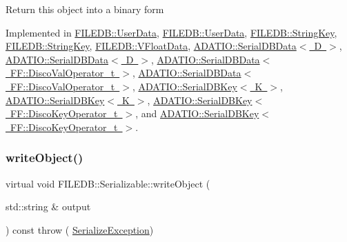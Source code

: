 Return this object into a binary form 

Implemented in \mbox{\hyperlink{classFILEDB_1_1UserData_a42b5e25b3cba7274363590c5b6861795}{F\+I\+L\+E\+D\+B\+::\+User\+Data}}, \mbox{\hyperlink{classFILEDB_1_1UserData_a42b5e25b3cba7274363590c5b6861795}{F\+I\+L\+E\+D\+B\+::\+User\+Data}}, \mbox{\hyperlink{classFILEDB_1_1StringKey_a29db7eea425c851c5e0a4336d7a85fb1}{F\+I\+L\+E\+D\+B\+::\+String\+Key}}, \mbox{\hyperlink{classFILEDB_1_1StringKey_a29db7eea425c851c5e0a4336d7a85fb1}{F\+I\+L\+E\+D\+B\+::\+String\+Key}}, \mbox{\hyperlink{classFILEDB_1_1VFloatData_afad9c7e520cdd7bf9ae0b477b8a5f1f1}{F\+I\+L\+E\+D\+B\+::\+V\+Float\+Data}}, \mbox{\hyperlink{classADATIO_1_1SerialDBData_a5266e4f1c065f0776f9974d6fad51a2f}{A\+D\+A\+T\+I\+O\+::\+Serial\+D\+B\+Data$<$ D $>$}}, \mbox{\hyperlink{classADATIO_1_1SerialDBData_a5266e4f1c065f0776f9974d6fad51a2f}{A\+D\+A\+T\+I\+O\+::\+Serial\+D\+B\+Data$<$ D $>$}}, \mbox{\hyperlink{classADATIO_1_1SerialDBData_a5266e4f1c065f0776f9974d6fad51a2f}{A\+D\+A\+T\+I\+O\+::\+Serial\+D\+B\+Data$<$ F\+F\+::\+Disco\+Val\+Operator\+\_\+t $>$}}, \mbox{\hyperlink{classADATIO_1_1SerialDBData_a5266e4f1c065f0776f9974d6fad51a2f}{A\+D\+A\+T\+I\+O\+::\+Serial\+D\+B\+Data$<$ F\+F\+::\+Disco\+Val\+Operator\+\_\+t $>$}}, \mbox{\hyperlink{classADATIO_1_1SerialDBKey_a6e2d9bbd18a3fa5e049f0ad5321d328a}{A\+D\+A\+T\+I\+O\+::\+Serial\+D\+B\+Key$<$ K $>$}}, \mbox{\hyperlink{classADATIO_1_1SerialDBKey_a6e2d9bbd18a3fa5e049f0ad5321d328a}{A\+D\+A\+T\+I\+O\+::\+Serial\+D\+B\+Key$<$ K $>$}}, \mbox{\hyperlink{classADATIO_1_1SerialDBKey_a6e2d9bbd18a3fa5e049f0ad5321d328a}{A\+D\+A\+T\+I\+O\+::\+Serial\+D\+B\+Key$<$ F\+F\+::\+Disco\+Key\+Operator\+\_\+t $>$}}, and \mbox{\hyperlink{classADATIO_1_1SerialDBKey_a6e2d9bbd18a3fa5e049f0ad5321d328a}{A\+D\+A\+T\+I\+O\+::\+Serial\+D\+B\+Key$<$ F\+F\+::\+Disco\+Key\+Operator\+\_\+t $>$}}.

\mbox{\label{classFILEDB_1_1Serializable_a8deaa86e108c08c863881e46cf5578ea}} 
\subsubsection{\texorpdfstring{writeObject()}{writeObject()}\hspace{0.1cm}{\footnotesize\ttfamily [2/2]}}
{\footnotesize\ttfamily virtual void F\+I\+L\+E\+D\+B\+::\+Serializable\+::write\+Object (\begin{DoxyParamCaption}\item[{std\+::string \&}]{output }\end{DoxyParamCaption}) const throw ( \mbox{\hyperlink{classFILEDB_1_1SerializeException}{Serialize\+Exception}}) \hspace{0.3cm}{\ttfamily [pure virtual]}}

